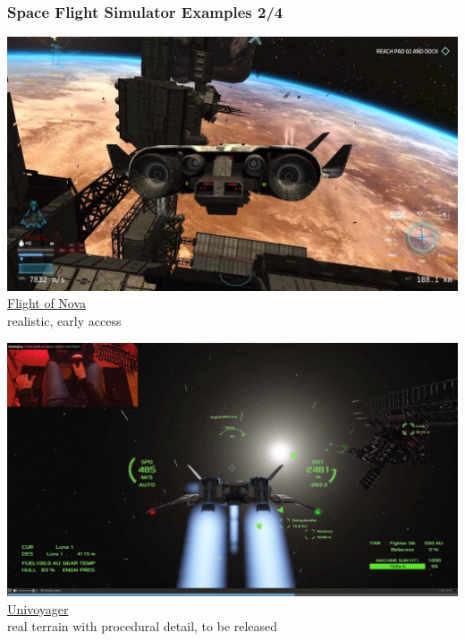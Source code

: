 \documentclass[aspectratio=169,11pt,xcolor=dvipsnames]{beamer}
\begin{document}
\begin{frame}
  \frametitle{Space Flight Simulator Examples 2/4}
  \begin{minipage}[t]{0.49\textwidth}
    \begin{center}
      \includegraphics[width=\textwidth]{flight-of-nova}\\
      \href{https://flight-of-nova.com/}{Flight of Nova}\\
      realistic, early access
    \end{center}
  \end{minipage}
  \begin{minipage}[t]{0.49\textwidth}
    \begin{center}
      \includegraphics[width=\textwidth]{univoyager}\\
      \href{https://www.univoyager.com/}{Univoyager}\\
      real terrain with procedural detail, to be released
    \end{center}
  \end{minipage}
\end{frame}
\end{document}
